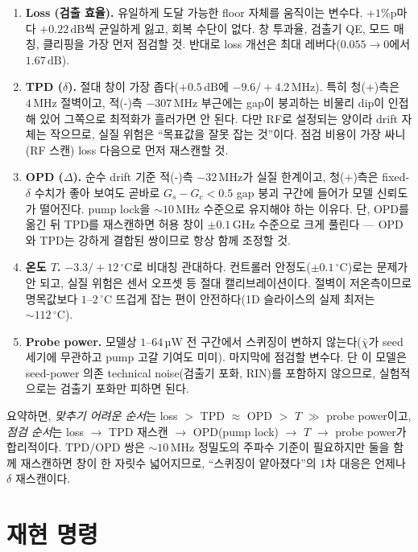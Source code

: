 \documentclass[11pt,a4paper]{article}
\newcommand{\dB}{\,\mathrm{dB}}
\newcommand{\GHz}{\,\mathrm{GHz}}
\newcommand{\MHz}{\,\mathrm{MHz}}
\newcommand{\degC}{\,^{\circ}\mathrm{C}}
\begin{document}
\begin{enumerate}[leftmargin=1.5em]
\item \textbf{Loss (검출 효율).} 유일하게 도달 가능한 floor 자체를 움직이는
      변수다. $+1\%$p마다 $+0.22\dB$씩 균일하게 잃고, 회복 수단이 없다.
      창 투과율, 검출기 QE, 모드 매칭, 클리핑을 가장 먼저 점검할 것.
      반대로 loss 개선은 최대 레버다($0.055\to0$에서 $1.67\dB$).
\item \textbf{TPD ($\delta$).} 절대 창이 가장 좁다($+0.5\dB$에
      $-9.6/+4.2\MHz$). 특히 청(+)측은 $4\MHz$ 절벽이고, 적(-)측
      $-307\MHz$ 부근에는 gap이 붕괴하는 비물리 dip이 인접해 있어 그쪽으로
      최적화가 흘러가면 안 된다. 다만 RF로 설정되는 양이라 drift 자체는
      작으므로, 실질 위험은 ``목표값을 잘못 잡는 것''이다. 점검 비용이
      가장 싸니(RF 스캔) loss 다음으로 먼저 재스캔할 것.
\item \textbf{OPD ($\Delta$).} 순수 drift 기준 적(-)측 $-32\MHz$가 실질
      한계이고, 청(+)측은 fixed-$\delta$ 수치가 좋아 보여도 곧바로
      $G_s-G_c<0.5$ gap 붕괴 구간에 들어가 모델 신뢰도가 떨어진다.
      pump lock을 $\sim10\MHz$ 수준으로 유지해야 하는 이유다. 단, OPD를
      옮긴 뒤 TPD를 재스캔하면 허용 창이 $\pm0.1\GHz$ 수준으로 크게
      풀린다 --- OPD와 TPD는 강하게 결합된 쌍이므로 항상 함께 조정할 것.
\item \textbf{온도 $T$.} $-3.3/+12\degC$로 비대칭 관대하다. 컨트롤러
      안정도($\pm0.1\degC$)로는 문제가 안 되고, 실질 위험은 센서 오프셋
      등 절대 캘리브레이션이다. 절벽이 저온측이므로 명목값보다 $1$--$2\degC$
      뜨겁게 잡는 편이 안전하다(1D 슬라이스의 실제 최저는 $\sim112\degC$).
\item \textbf{Probe power.} 모델상 $1$--$64$\,µW 전 구간에서 스퀴징이
      변하지 않는다($\bar\chi$가 seed 세기에 무관하고 pump 고갈 기여도
      미미). 마지막에 점검할 변수다. 단 이 모델은 seed-power 의존
      technical noise(검출기 포화, RIN)를 포함하지 않으므로, 실험적으로는
      검출기 포화만 피하면 된다.
\end{enumerate}

요약하면, \emph{맞추기 어려운 순서}는 loss $>$ TPD $\approx$ OPD $>$ $T$
$\gg$ probe power이고, \emph{점검 순서}는 loss $\to$ TPD 재스캔 $\to$
OPD(pump lock) $\to$ $T$ $\to$ probe power가 합리적이다. TPD/OPD 쌍은
$\sim10\MHz$ 정밀도의 주파수 기준이 필요하지만 둘을 함께 재스캔하면 창이
한 자릿수 넓어지므로, ``스퀴징이 얕아졌다''의 1차 대응은 언제나
$\delta$ 재스캔이다.

\section{재현 명령}
\end{document}
